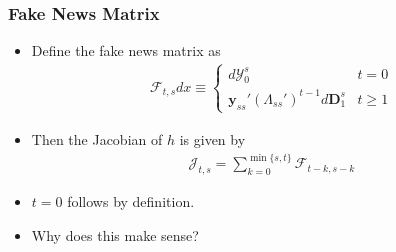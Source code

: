 \documentclass[english,xcolor=svgnames]{beamer}
\begin{document}
\begin{frame}
    \frametitle{Fake News Matrix}
    \begin{itemize}
    	\item Define the fake news matrix as
    	\begin{align*}
    		\mathcal{F}_{t,s}dx \equiv \begin{cases}
    			d\mathcal{Y}_0^s & t=0 \\
    			\bm{y}_{ss}' (\Lambda_{ss}')^{t-1}d\bm{D}_1^s & t\ge 1
    		\end{cases}
    	\end{align*}
        \item Then the Jacobian of $h$ is given by
        \begin{align*}
        	\mathcal{J}_{t,s} = \sum_{k=0}^{\min\{s,t\}}\mathcal{F}_{t-k,s-k}
        \end{align*}
        \item $t=0$ follows by definition.
        \item Why does this make sense?
	\end{itemize}
\end{frame}
\end{document}
